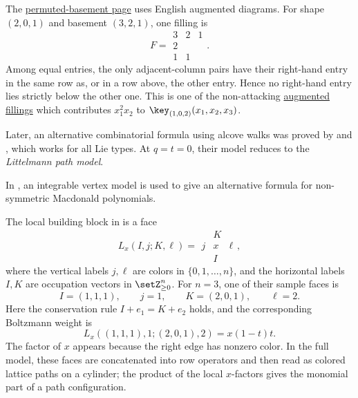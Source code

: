 \begin{example*}
The \hyperref[macdonaldEpermDefinition]{permuted-basement page} uses English
augmented diagrams.  For shape $(2,0,1)$ and basement $(3,2,1)$, one filling
is
\[
F=
\begin{array}{c|cc}
3 & 2 & 1\\
2 & {} & {}\\
1 & 1 & {}
\end{array}.
\]
Among equal entries, the only adjacent-column pairs have their right-hand entry
in the same row as, or in a row above, the other entry.  Hence no right-hand
entry lies strictly below the other one.  This is one of the non-attacking
\hyperref[augmentedFilling]{augmented fillings} which contributes $x_1^2x_2$ to
\(\key_{(1,0,2)}(x_1,x_2,x_3)\).
\end{example*}

Later, an alternative combinatorial formula using alcove walks was
proved by  and  \cite{RamYip2011}, which
works for all Lie types.
At $q=t=0$, their model reduces to the \emph{Littelmann path model}.

In \cite{BorodinWheeler2019}, an integrable vertex model is used to
give an alternative formula for non-symmetric Macdonald polynomials.

\begin{example}
The local building block in \cite[Eq.~(3.7)]{BorodinWheeler2019} is a face
\[
  L_x(I,j;K,\ell)
  =
  \begin{array}{ccc}
      & K &  \\
    j & \boxed{x} & \ell \\
      & I &
  \end{array},
\]
where the vertical labels $j,\ell$ are colors in $\{0,1,\dotsc,n\}$, and
the horizontal labels $I,K$ are occupation vectors in $\setZ_{\geq 0}^n$.
For $n=3$, one of their sample faces is
\[
  I=(1,1,1),\qquad j=1,\qquad K=(2,0,1),\qquad \ell=2.
\]
Here the conservation rule $I+e_1=K+e_2$ holds, and the corresponding
Boltzmann weight is
\[
  L_x((1,1,1),1;(2,0,1),2)=x(1-t)t.
\]
The factor of $x$ appears because the right edge has nonzero color.  In the
full model, these faces are concatenated into row operators and then read as
colored lattice paths on a cylinder; the product of the local $x$-factors
gives the monomial part of a path configuration.
\end{example}

